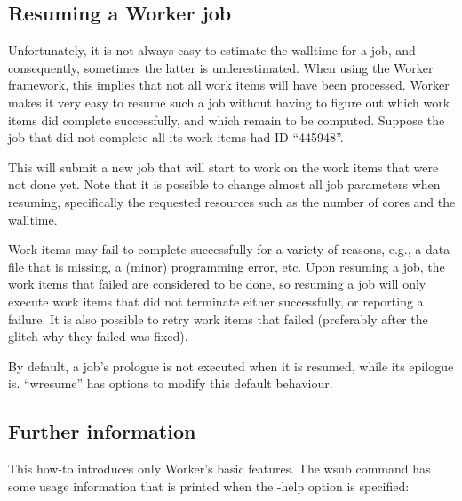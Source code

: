 \subsection{Resuming a Worker job}

Unfortunately, it is not always easy to estimate the walltime for a job, and
consequently, sometimes the latter is underestimated. When using the Worker
framework, this implies that not all work items will have been processed.
Worker makes it very easy to resume such a job without having to figure out
which work items did complete successfully, and which remain to be computed.
Suppose the job that did not complete all its work items had ID ``445948''.

\begin{prompt}
\end{prompt}

This will submit a new job that will start to work on the work items that were
not done yet. Note that it is possible to change almost all job parameters when
resuming, specifically the requested resources such as the number of cores and
the walltime.

\begin{prompt}
\end{prompt}

Work items may fail to complete successfully for a variety of reasons, e.g., a
data file that is missing, a (minor) programming error, etc. Upon resuming a
job, the work items that failed are considered to be done, so resuming a job
will only execute work items that did not terminate either successfully, or
reporting a failure. It is also possible to retry work items that failed
(preferably after the glitch why they failed was fixed).

\begin{prompt}
\end{prompt}

By default, a job's prologue is not executed when it is resumed, while its
epilogue is. ``wresume'' has options to modify this default behaviour.

\subsection{Further information}

This how-to introduces only Worker's basic features. The wsub command has some
usage information that is printed when the -help option is specified:

